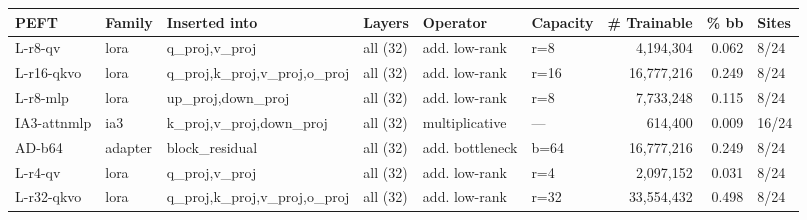 \begin{tabular}{llllllrr l}
\toprule
PEFT & Family & Inserted into & Layers & Operator & Capacity & \# Trainable & \% bb & Sites \\
\midrule
L-r8-qv & lora & q\_proj,v\_proj & all (32) & add. low-rank & r=8 & 4,194,304 & 0.062 & 8/24 \\
L-r16-qkvo & lora & q\_proj,k\_proj,v\_proj,o\_proj & all (32) & add. low-rank & r=16 & 16,777,216 & 0.249 & 8/24 \\
L-r8-mlp & lora & up\_proj,down\_proj & all (32) & add. low-rank & r=8 & 7,733,248 & 0.115 & 8/24 \\
IA3-attnmlp & ia3 & k\_proj,v\_proj,down\_proj & all (32) & multiplicative & — & 614,400 & 0.009 & 16/24 \\
AD-b64 & adapter & block\_residual & all (32) & add. bottleneck & b=64 & 16,777,216 & 0.249 & 8/24 \\
L-r4-qv & lora & q\_proj,v\_proj & all (32) & add. low-rank & r=4 & 2,097,152 & 0.031 & 8/24 \\
L-r32-qkvo & lora & q\_proj,k\_proj,v\_proj,o\_proj & all (32) & add. low-rank & r=32 & 33,554,432 & 0.498 & 8/24 \\
\bottomrule
\end{tabular}
